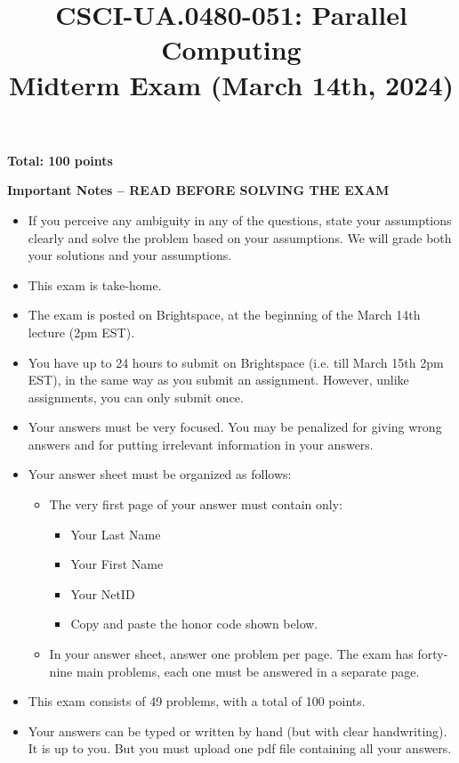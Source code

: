 \documentclass{article}
\begin{document}
\title{CSCI-UA.0480-051: Parallel Computing \\ Midterm Exam (March 14th, 2024)}
\author{}
\date{}
\maketitle

\textbf{Total: 100 points}

\textbf{Important Notes -- READ BEFORE SOLVING THE EXAM}

\begin{itemize}
    \item If you perceive any ambiguity in any of the questions, state your assumptions clearly and solve the problem based on your assumptions. We will grade both your solutions and your assumptions.
    \item This exam is take-home.
    \item The exam is posted on Brightspace, at the beginning of the March 14th lecture (2pm EST).
    \item You have up to 24 hours to submit on Brightspace (i.e. till March 15th 2pm EST), in the same way as you submit an assignment. However, unlike assignments, you can only submit once.
    \item Your answers must be very focused. You may be penalized for giving wrong answers and for putting irrelevant information in your answers.
    \item Your answer sheet must be organized as follows:
    \begin{itemize}
        \item The very first page of your answer must contain only:
        \begin{itemize}
            \item Your Last Name
            \item Your First Name
            \item Your NetID
            \item Copy and paste the honor code shown below.
        \end{itemize}
        \item In your answer sheet, answer one problem per page. The exam has forty-nine main problems, each one must be answered in a separate page.
    \end{itemize}
    \item This exam consists of 49 problems, with a total of 100 points.
    \item Your answers can be typed or written by hand (but with clear handwriting). It is up to you. But you must upload one pdf file containing all your answers.
\end{itemize}
\end{document}
